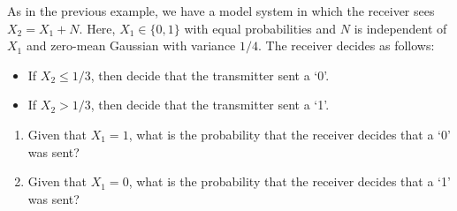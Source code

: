   As in the
previous example, we have a model system in which the receiver sees
$X_2 = X_1 + N$.  Here, $X_1 \in \{0,1\}$ with equal probabilities
and $N$ is independent of $X_1$ and zero-mean Gaussian with variance
$1/4$. The receiver decides as follows:
\begin{itemize}
  \item If $X_2 \le 1/3$, then decide that the transmitter sent a `0'.
  \item If $X_2 > 1/3$, then decide that the transmitter sent a `1'.
\end{itemize}
\begin{enumerate}
  \item Given that $X_1=1$, what is the probability that the receiver decides that a `0' was sent?
  \item Given that $X_1=0$, what is the probability that the receiver decides that a `1' was sent?
\end{enumerate}



